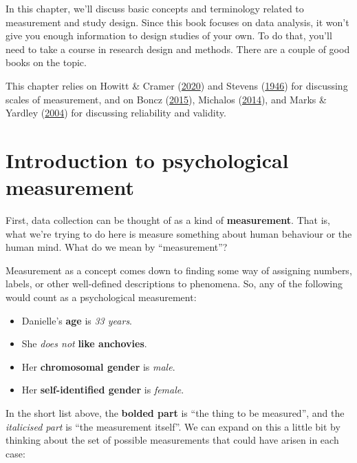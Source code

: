 \documentclass[
  11pt,
  a4paper,
  twoside,symmetric,openright]{book}
\providecommand{\tightlist}{%
  \setlength{\itemsep}{0pt}\setlength{\parskip}{0pt}}
\theoremstyle{break}
\theoremstyle{break}
\begin{document}
In this chapter, we'll discuss basic concepts and terminology related to measurement and study design. Since this book focuses on data analysis, it won't give you enough information to design studies of your own. To do that, you'll need to take a course in research design and methods. There are a couple of good books on the topic.

This chapter relies on Howitt \& Cramer (\protect\hyperlink{ref-howittUnderstandingStatisticsPsychology2020}{2020}) and Stevens (\protect\hyperlink{ref-Stevens1946}{1946}) for discussing scales of measurement, and on Boncz (\protect\hyperlink{ref-bonczResearchMethodologyBasics2015}{2015}), Michalos (\protect\hyperlink{ref-michalosEncyclopediaQualityLife2014}{2014}), and Marks \& Yardley (\protect\hyperlink{ref-marksResearchMethodsClinical2004}{2004}) for discussing reliability and validity.

\hypertarget{measurement}{%
\section{Introduction to psychological measurement}\label{measurement}}

First, data collection can be thought of as a kind of \textbf{measurement}. That is, what we're trying to do here is measure something about human behaviour or the human mind. What do we mean by ``measurement''?

Measurement as a concept comes down to finding some way of assigning numbers, labels, or other well-defined descriptions to phenomena. So, any of the following would count as a psychological measurement:

\begin{itemize}
\tightlist
\item
  Danielle's \textbf{age} is \emph{33 years}.
\item
  She \emph{does not} \textbf{like anchovies}.
\item
  Her \textbf{chromosomal gender} is \emph{male}.
\item
  Her \textbf{self-identified gender} is \emph{female}.
\end{itemize}

In the short list above, the \textbf{bolded part} is ``the thing to be measured'', and the \emph{italicised part} is ``the measurement itself''. We can expand on this a little bit by thinking about the set of possible measurements that could have arisen in each case:
\end{document}
